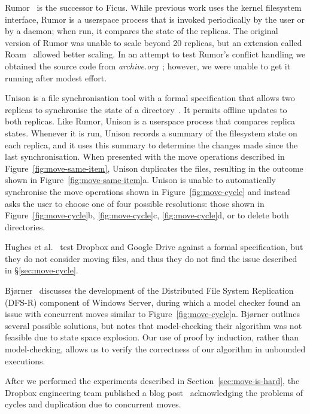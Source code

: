 \documentclass[10pt,journal,compsoc]{IEEEtran}
\begin{document}
Rumor~\cite{Guy:1999gy,RumorManual} is the successor to Ficus.
While previous work uses the kernel filesystem interface, Rumor is a userspace process that is invoked periodically by the user or by a daemon; when run, it compares the state of the replicas.
The original version of Rumor was unable to scale beyond 20 replicas, but an extension called Roam~\cite{Ratner:1999fh} allowed better scaling. 
In an attempt to test Rumor's conflict handling we obtained the source code from \emph{archive.org}~\cite{RumorSource}; however, we were unable to get it running after modest effort.

Unison is a file synchronisation tool with a formal specification that allows two replicas to synchronise the state of a directory~\cite{PierceVouillon:UnisonSpecTR}.
It permits offline updates to both replicas.
Like Rumor, Unison is a userspace process that compares replica states.
Whenever it is run, Unison records a summary of the filesystem state on each replica, and it uses this summary to determine the changes made since the last synchronisation. 
When presented with the move operations described in Figure~\ref{fig:move-same-item}, Unison duplicates the files, resulting in the outcome shown in Figure~\ref{fig:move-same-item}a. 
Unison is unable to automatically synchronise the move operations shown in Figure~\ref{fig:move-cycle} and instead asks the user to choose one of four possible resolutions: those shown in Figure~\ref{fig:move-cycle}b, \ref{fig:move-cycle}c, \ref{fig:move-cycle}d, or to delete both directories.

Hughes et al.~\cite{Hughes:2016fp} test Dropbox and Google Drive against a formal specification, but they do not consider moving files, and thus they do not find the issue described in \S\ref{sec:move-cycle}.

Bj{\o}rner~\cite{Bjorner:2007hp} discusses the development of the Distributed File System Replication (DFS-R) component of Windows Server, during which a model checker found an issue with concurrent moves similar to Figure~\ref{fig:move-cycle}a.
Bj{\o}rner outlines several possible solutions, but notes that model-checking their algorithm was not feasible due to state space explosion.
Our use of proof by induction, rather than model-checking, allows us to verify the correctness of our algorithm in unbounded executions.

After we performed the experiments described in Section~\ref{sec:move-is-hard}, the Dropbox engineering team published a blog post~\cite{Dropbox2020sync} acknowledging the problems of cycles and duplication due to concurrent moves.
\end{document}

